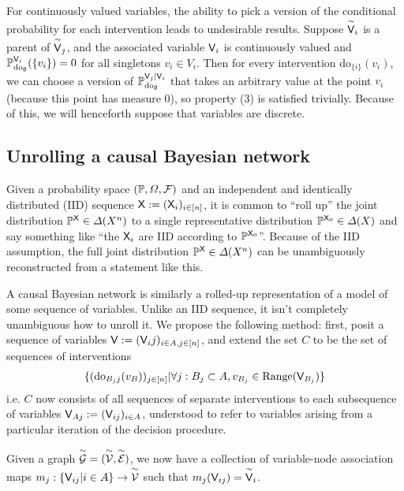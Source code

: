 For continuously valued variables, the ability to pick a version of the conditional probability for each intervention leads to undesirable results. Suppose $\overset{\sim}{\mathsf{V}}_i$ is a parent of $\overset{\sim}{\mathsf{V}}_j$, and the associated variable $\mathsf{V}_i$ is continuously valued and $\mathbb{P}_{\mathrm{do}_{\emptyset}}^{\mathsf{V}_i}(\{v_i\})=0$ for all singletons $v_i\in V_i$. Then for every intervention $\mathrm{do}_{\{i\}}(v_i)$, we can choose a version of $\mathbb{P}_{\mathrm{do}_{\emptyset}}^{\mathsf{V}_j|\mathsf{V}_i}$ that takes an arbitrary value at the point $v_i$ (because this point has measure 0), so property (3) is satisfied trivially. Because of this, we will henceforth suppose that variables are discrete.

\subsection{Unrolling a causal Bayesian network}\label{sec:unrolling}

Given a probability space $(\mathbb{P},\Omega,\mathcal{F})$ and an independent and identically distributed (IID) sequence $\mathsf{X}:=(\mathsf{X}_i)_{i\in [n]}$, it is common to ``roll up'' the joint distribution $\mathbb{P}^{\mathsf{X}}\in\Delta(X^n)$ to a single representative distribution $\mathbb{P}^{\mathsf{X}_0}\in \Delta(X)$ and say something like ``the $\mathsf{X}_i$ are IID according to $\mathbb{P}^{\mathsf{X}_0}$''. Because of the IID assumption, the full joint distribution $\mathbb{P}^{\mathsf{X}}\in\Delta(X^n)$ can be unambiguously reconstructed from a statement like this.

A causal Bayesian network is similarly a rolled-up representation of a model of some sequence of variables. Unlike an IID sequence, it isn't completely unambiguous how to unroll it. We propose the following method: first, posit a sequence of variables $\mathsf{V}:= (\mathsf{V}_ij)_{i\in A,j\in [n]}$, and extend the set $C$ to be the set of sequences of interventions 
\begin{align}
\{(\mathrm{do}_{B_j j}(v_B))_{j\in [n]}|\forall j: B_j \subset A,v_{B_j}\in \mathrm{Range}(\mathsf{V}_{B_j})\}
\end{align}
i.e. $C$ now consists of all sequences of separate interventions to each subsequence of variables $\mathsf{V}_{Aj}:=(\mathsf{V}_{ij})_{i\in A}$, understood to refer to variables arising from a particular iteration of the decision procedure. 

Given a graph $\overset{\sim}{\mathcal{G}}=(\overset{\sim}{\mathcal{V}},\overset{\sim}{\mathcal{E}})$, we now have a collection of variable-node association maps $m_j:\{\mathsf{V}_{ij}|i\in A\}\to \overset{\sim}{\mathcal{V}}$ such that $m_j(\mathsf{V}_{ij})=\overset{\sim}{\mathsf{V}}_i$.

